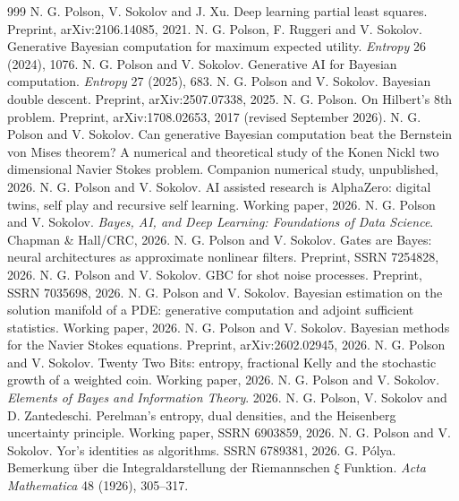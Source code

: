 \begin{thebibliography}{999}
 N. G. Polson, V. Sokolov and J. Xu. Deep learning partial least squares. Preprint, arXiv:2106.14085, 2021.
 N. G. Polson, F. Ruggeri and V. Sokolov. Generative Bayesian computation for maximum expected utility. \emph{Entropy} 26 (2024), 1076.
 N. G. Polson and V. Sokolov. Generative AI for Bayesian computation. \emph{Entropy} 27 (2025), 683.
 N. G. Polson and V. Sokolov. Bayesian double descent. Preprint, arXiv:2507.07338, 2025.
 N. G. Polson. On Hilbert's 8th problem. Preprint, arXiv:1708.02653, 2017 (revised September 2026).
 N. G. Polson and V. Sokolov. Can generative Bayesian computation beat the Bernstein von Mises theorem? A numerical and theoretical study of the Konen Nickl two dimensional Navier Stokes problem. Companion numerical study, unpublished, 2026.
 N. G. Polson and V. Sokolov. AI assisted research is AlphaZero: digital twins, self play and recursive self learning. Working paper, 2026.
 N. G. Polson and V. Sokolov. \emph{Bayes, AI, and Deep Learning: Foundations of Data Science}. Chapman \& Hall/CRC, 2026.
 N. G. Polson and V. Sokolov. Gates are Bayes: neural architectures as approximate nonlinear filters. Preprint, SSRN 7254828, 2026.
 N. G. Polson and V. Sokolov. GBC for shot noise processes. Preprint, SSRN 7035698, 2026.
 N. G. Polson and V. Sokolov. Bayesian estimation on the solution manifold of a PDE: generative computation and adjoint sufficient statistics. Working paper, 2026.
 N. G. Polson and V. Sokolov. Bayesian methods for the Navier Stokes equations. Preprint, arXiv:2602.02945, 2026.
 N. G. Polson and V. Sokolov. Twenty Two Bits: entropy, fractional Kelly and the stochastic growth of a weighted coin. Working paper, 2026.
 N. G. Polson and V. Sokolov. \emph{Elements of Bayes and Information Theory}. 2026.
 N. G. Polson, V. Sokolov and D. Zantedeschi. Perelman's entropy, dual densities, and the Heisenberg uncertainty principle. Working paper, SSRN 6903859, 2026.
 N. G. Polson and V. Sokolov. Yor's identities as algorithms. SSRN 6789381, 2026.
 G. P\'olya. Bemerkung \"uber die Integraldarstellung der Riemannschen $\xi$ Funktion. \emph{Acta Mathematica} 48 (1926), 305--317.

\end{thebibliography}
